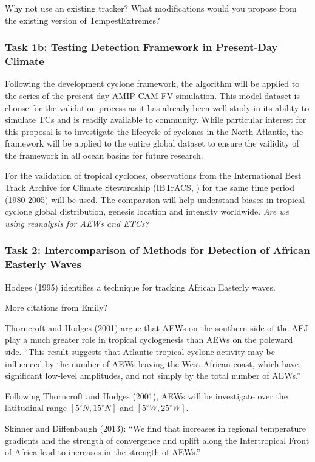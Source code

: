 \documentclass[11pt]{article}
\begin{document}
{\color{red} Why not use an existing tracker?  What modifications would you propose from the existing version of TempestExtremes?}

\subsubsection{Task 1b: Testing Detection Framework in Present-Day Climate}

Following the development cyclone framework, the algorithm will be applied to the series of the present-day AMIP CAM-FV simulation. This model dataset is choose for the validation process as it has already been well study in its ability to simulate TCs \citep{Bacmeister2014,Wehner2014} and is readily available to community. While particular interest for this proposal is to investigate the lifecycle of cyclones in the North Atlantic, the framework will be applied to the entire global dataset to ensure the vailidity of the framework in all ocean basins for future research. 

For the validation of tropical cyclones, observations from the International Best Track Archive for Climate Stewardship (IBTrACS, \citet{Knapp2010}) for the same time period (1980-2005) will be used. The comparsion will help understand biases in tropical cyclone global distribution, genesis location and intensity worldwide. \emph{Are we using reanalysis for AEWs and ETCs?}

\subsubsection{Task 2: Intercomparison of Methods for Detection of African Easterly Waves} 

Hodges (1995) identifies a technique for tracking African Easterly waves.

{\color{red} More citations from Emily?}

Thorncroft and Hodges (2001) argue that AEWs on the southern side of the AEJ play a much greater role in tropical cyclogenesis than AEWs on the poleward side.  ``This result suggests that Atlantic tropical cyclone activity may be influenced by the number of AEWs leaving the West African coast, which have significant low-level amplitudes, and not simply by the total number of AEWs.''

Following Thorncroft and Hodges (2001), AEWs will be investigate over the latitudinal range $[5^\circ N, 15^\circ N]$ and $[5^\circ W, 25^\circ W]$.

Skinner and Diffenbaugh (2013): ``We find that increases in regional temperature gradients and the strength of convergence and uplift along the Intertropical Front of Africa lead to increases in the strength of AEWs.''  
\end{document}
